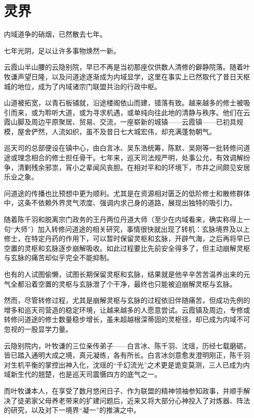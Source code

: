 \chapter{灵界}

内域道争的硝烟，已然散去七年。

七年光阴，足以让许多事物焕然一新。

云霞山半山腰的云隐别院，早已不再是当初那座仅供数人清修的僻静院落。随着叶牧谦声望日隆，以及问道途逐渐成为内域显学，这里在事实上已然取代了昔日天枢城的地位，成为了内域诸宗门联盟共治的行政中枢。

山道被拓宽，以青石板铺就，沿途楼阁依山而建，错落有致。越来越多的修士被吸引而来，或为聆听大道，或为寻求机遇，或单纯向往此地的清静与秩序。他们在云霞山脚及周边平原聚居、贸易、交流，一座崭新的城镇——云霞镇——已初具规模，屋舍俨然，人流如织，虽不及昔日七大城宏伟，却充满蓬勃朝气。

巡天司的总部便设在镇中心，由白言冰、吴东浩统筹，陈默、吴刚等一批转修问道途或理念相合的修士担任骨干。七年来，巡天司法规严明，处事公允，有效调解纷争，清剿残余邪祟，宵小之辈闻风丧胆。在相对平和的环境下，市井之间颇见安居乐业之象。

问道途的传播也比预想中更为顺利。尤其是在资源相对匮乏的低阶修士和散修群体中，这条不依赖外界灵气浓度、强调内求己身的道路，展现出独特的吸引力。

随着陈千羽和脱离宗门政务的王丹两位丹道大师（至少在内域看来，确实称得上一句“大师”）加入转修问道途的相关研究，事情很快就出现了转机：玄脉境界及以上修士，在特定丹药的作用下，可以暂时保留灵枢和玄脉，开辟气海，之后再将早已空置的灵枢和玄脉逐步崩解吸收。如此过程要比先前安全得多了，但主动崩解灵枢与玄脉的痛苦却似乎完全不能抑制。

也有的人试图偷懒，试图长期保留灵枢和玄脉，结果就是他辛辛苦苦温养出来的元气全都沿着空置的灵枢与玄脉泄了个干净，最终也只能被迫崩解灵枢与玄脉。

然而，尽管转修过程，尤其是崩解灵枢与玄脉的过程依旧伴随痛苦，但成功先例的增多和巡天司营造的稳定环境，让越来越多的人愿意尝试。云霞镇及周边，专修或转修问道途的修士数量稳步增长，虽未超越根深蒂固的灵枢径，却已成为内域不可忽视的一股显学力量。

云隐别院内，叶牧谦的三位亲传弟子——白言冰、陈千羽、沈瑶，历经七载磨砺，皆已踏入通明大成之境，真元凝练，各有所长。白言冰剑意愈发澄明刚正，陈千羽对生机平衡的掌控出神入化，沈瑶的“千幻流光”之术更是诡变莫测，三人已成为内域新生代的翘楚，也是巡天司震慑四方的底气之一。

而叶牧谦本人，在享受了数月悠闲日子、作为联盟的精神领袖参知政事，并顺手解决了徒弟家父母养老带来的扩建问题后，近来又将大部分心神投入了对炼器、阵法的研究，以及对下一境界“凝一”的推演之中。

